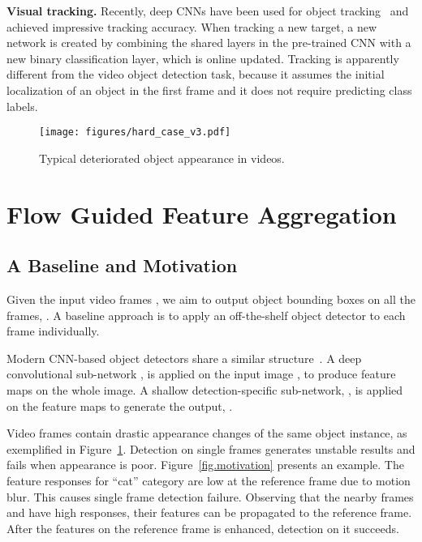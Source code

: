 \documentclass[10pt,twocolumn,letterpaper]{article}
\begin{document}
\textbf{Visual tracking.}  Recently, deep CNNs have been used for object tracking~\cite{Wang2015tracking,Nam2015tracking} and achieved impressive tracking accuracy. When tracking a new target, a new network is created by combining the shared layers in the pre-trained CNN with a new binary classification layer, which is online updated. Tracking is apparently different from the video object detection task, because it assumes the initial localization of an object in the first frame and it does not require predicting class labels.

\begin{figure}
\begin{center}
\texttt{[image: figures/hard\_case\_v3.pdf]}
\end{center}
\caption{Typical deteriorated object appearance in videos.}
\label{fig.challenges}
\end{figure}

\section{Flow Guided Feature Aggregation}

\subsection{A Baseline and Motivation}

Given the input video frames , we aim to output object bounding boxes on all the frames, . A baseline approach is to apply an off-the-shelf object detector to each frame individually.

Modern CNN-based object detectors share a similar structure~\cite{girshick2014rich,girshick2015fast,ren2015faster,liu2016ssd,dai2016rfcn}. A deep convolutional sub-network , is applied on the input image , to produce feature maps  on the whole image. A shallow detection-specific sub-network, , is applied on the feature maps to generate the output, .

Video frames contain drastic appearance changes of the same object instance, as exemplified in Figure~\ref{fig.challenges}. Detection on single frames generates unstable results and fails when appearance is poor. Figure~\ref{fig.motivation} presents an example. The feature responses for ``cat'' category are low at the reference frame  due to motion blur. This causes single frame detection failure. Observing that the nearby frames  and  have high responses, their features can be propagated to the reference frame. After the features on the reference frame is enhanced, detection on it succeeds.
\end{document}
